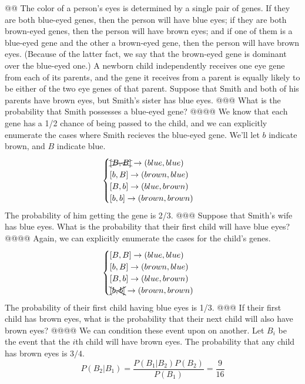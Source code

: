 \documentclass[10pt]{article}
\begin{document}
\begin{easylist}[enumerate]
    @@ The color of a person's eyes is determined by a single pair of genes. If they are both blue-eyed genes, then the
    person will have blue eyes; if they are both brown-eyed genes, then the person will have brown eyes; and if one of
    them is a blue-eyed gene and the other a brown-eyed gene, then the person will have brown eyes. (Because of the
    latter fact, we say that the brown-eyed gene is dominant over the blue-eyed one.) A newborn child independently
    receives one eye gene from each of its parents, and the gene it receives from a parent is equally likely to be
    either of the two eye genes of that parent. Suppose that Smith and both of his parents have brown eyes, but Smith's
    sister has blue eyes.
    @@@ What is the probability that Smith possesses a blue-eyed gene?
    @@@@ We know that each gene has a 1/2 chance of being passed to the child, and we can explicitly enumerate the cases
    where Smith recieves the blue-eyed gene. We'll let $b$ indicate brown, and $B$ indicate blue.
        \[
            \begin{cases}
                \xcancel{[B, B]} \to (blue, blue)\\
                [ b, B ] \to (brown, blue)\\
                [ B, b ] \to (blue, brown)\\
                [ b, b ] \to (brown, brown)\\
            \end{cases}
        \]
    The probability of him getting the gene is 2/3.
    @@@ Suppose that Smith's wife has blue eyes. What is the probability that their first child will have blue eyes?
    @@@@ Again, we can explicitly enumerate the cases for the child's genes.
        \[
            \begin{cases}
                [ B, B ] \to (blue, blue)\\
                [ b, B ] \to (brown, blue)\\
                [ B, b ] \to (blue, brown)\\
                \xcancel{[ b, b ]} \to (brown, brown)\\
            \end{cases}
        \]
    The probability of their first child having blue eyes is 1/3.
    @@@ If their first child has brown eyes, what is the probability that their next child will also have brown eyes?
    @@@@ We can condition these event upon on another. Let $B_i$ be the event that the $i$th child will have brown eyes.
    The probability that any child has brown eyes is $3/4$.
        \[
            P(B_2|B_1) = \frac{P(B_1|B_2)P(B_2)}{P(B_1)} = \boxed{\frac{9}{16}}
        \]


\end{easylist}
\end{document}
